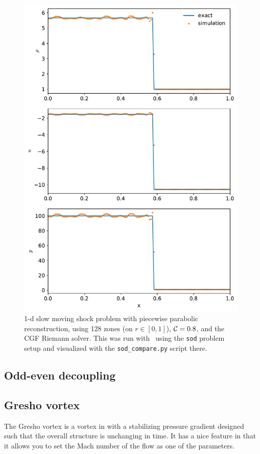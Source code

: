 \begin{figure}[t]
\centering
\includegraphics[width=0.7\linewidth]{slowshock}
\caption[1-d spherical Sedov problem]{\label{fig:Euler:slowshock:ppm} 1-d slow moving shock
  problem with
  piecewise parabolic reconstruction, using 128 zones (on $r \in
  [0,1]$), ${\mathcal{C}} = 0.8$, and the CGF Riemann solver.  This was run
  with \hydrooned\ using the {\tt sod} problem setup and visualized
  with the {\tt sod\_compare.py} script there.}
\end{figure}


\ifdefined \debugmode
\subsection{Odd-even decoupling}

\subsection{Gresho vortex}

The Gresho vortex is a vortex in with a stabilizing pressure gradient
designed such that the overall structure is unchanging in time.  It
has a nice feature in that it allows you to set the Mach number of
the flow as one of the parameters.

\fi

